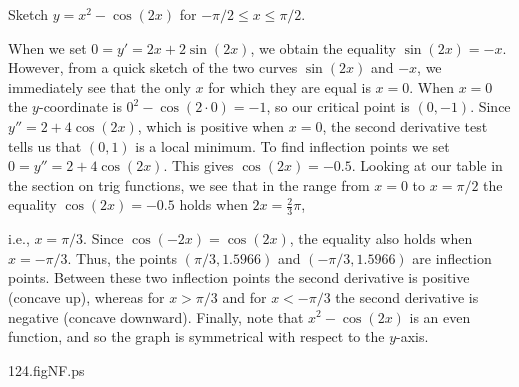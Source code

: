 \begin{example}

Sketch $y=x^2-\cos(2x)$ for $-\pi/2\le x\le\pi/2$.

\smallskip

When we set $0=y'=2x+2\sin(2x)$, we obtain the equality $\sin(2x)=-x$.
However, from a quick sketch of the two curves $\sin(2x)$ and $-x$, we
immediately see that the only $x$ for which they are equal is $x=0$.  When
$x=0$ the $y$-coordinate is $0^2-\cos(2\cdot 0)=-1$, so our critical point
is $(0,-1)$.  Since $y''=2+4\cos(2x)$, which is positive when $x=0$, the
second derivative test tells us that $(0,1)$ is a local minimum.  To find
inflection points we set $0=y''=2+4\cos(2x)$.  This gives $\cos(2x)=-0.5$.
Looking at our table in the section on trig functions, we see that in the
range from $x=0$ to $x=\pi/2$ the equality $\cos(2x)=-0.5$ holds when
$2x=\frac{2}{ 3}\pi$, 
\begin{rightindent}{3in}
\noindent
i.e., $x=\pi/3$.  Since $\cos(-2x)=\cos(2x)$, the
equality also holds when $x=-\pi/3$.  Thus, the points $(\pi/3,1.5966)$ and
$(-\pi/3,1.5966)$ are inflection points.  Between these two inflection
points the second derivative is positive (concave up), whereas for
$x>\pi/3$ and for $x<-\pi/3$ the second derivative is negative (concave
downward).  Finally, note that $x^2-\cos(2x)$ is an even function, and so
the graph is symmetrical with respect to the $y$-axis.
\end{rightindent}
\begin{psfigure}{2.0in}{1.8in}{124.figNF.ps}
\end{psfigure}
\end{example}


